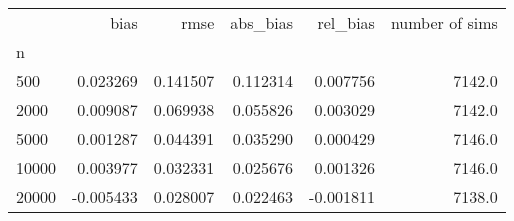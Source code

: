 \begin{tabular}{lrrrrr}
\toprule
{} &      bias &      rmse &  abs_bias &  rel_bias &  number of sims \\
n     &           &           &           &           &                 \\
\midrule
500   &  0.023269 &  0.141507 &  0.112314 &  0.007756 &          7142.0 \\
2000  &  0.009087 &  0.069938 &  0.055826 &  0.003029 &          7142.0 \\
5000  &  0.001287 &  0.044391 &  0.035290 &  0.000429 &          7146.0 \\
10000 &  0.003977 &  0.032331 &  0.025676 &  0.001326 &          7146.0 \\
20000 & -0.005433 &  0.028007 &  0.022463 & -0.001811 &          7138.0 \\
\bottomrule
\end{tabular}
